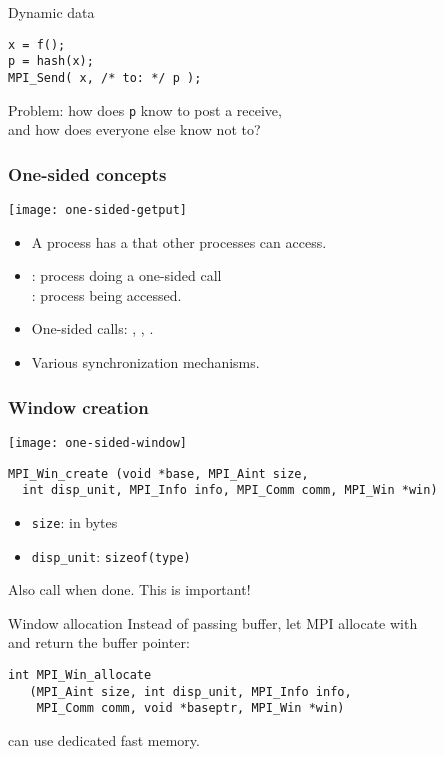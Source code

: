 \begin{frame}[containsverbatim]{Dynamic data}
\begin{lstlisting}
x = f();
p = hash(x);
MPI_Send( x, /* to: */ p );
\end{lstlisting}
Problem: how does \lstinline{p} know to post a receive,\\
and how does everyone else know not to?
\end{frame}

\begin{frame}[containsverbatim]\frametitle{One-sided concepts}
  \texttt{[image: one-sided-getput]}
  \begin{itemize}
  \item A process has a  that other processes can access.
  \item {}: process doing a one-sided call\\
    : process being accessed.
  \item One-sided calls: , , .
  \item Various synchronization mechanisms.
  \end{itemize}
\end{frame}

\begin{frame}[containsverbatim]\frametitle{Window creation}
  \texttt{[image: one-sided-window]}
\lstset{language=C}
\begin{lstlisting}
MPI_Win_create (void *base, MPI_Aint size, 
  int disp_unit, MPI_Info info, MPI_Comm comm, MPI_Win *win)
\end{lstlisting}
\begin{itemize}
\item \lstinline{size}: in bytes
\item \lstinline{disp_unit}: \lstinline{sizeof(type)}
\end{itemize}
Also call  when done. This is important!
\end{frame}

\begin{frame}[containsverbatim]{Window allocation}
  Instead of passing buffer, let MPI allocate with
  \\
  and return the buffer pointer:
\lstset{language=C}
\begin{lstlisting}
int MPI_Win_allocate
   (MPI_Aint size, int disp_unit, MPI_Info info,
    MPI_Comm comm, void *baseptr, MPI_Win *win)
\end{lstlisting}
can use dedicated fast memory.
\end{frame}


